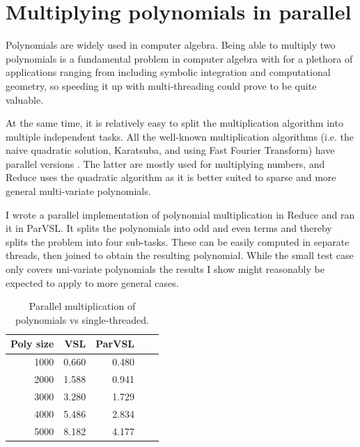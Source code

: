 \section{Multiplying polynomials in parallel}

Polynomials are widely used in computer algebra. Being able
to multiply two polynomials is a fundamental problem in computer
algebra with for a plethora of applications ranging from
including symbolic integration and computational geometry,
so speeding it up with multi-threading could prove to be quite valuable.

At the same time, it is relatively easy to split the multiplication
algorithm into multiple independent tasks. All the well-known
multiplication algorithms (i.e. the naive quadratic solution, Karatsuba,
and using Fast Fourier Transform) have parallel versions \cite[Chapter~30.3]{cormen}.
The latter are mostly used for multiplying numbers, and Reduce
uses the quadratic algorithm as it is better suited to sparse and
more general multi-variate polynomials.

I wrote a parallel implementation of polynomial multiplication in Reduce
and ran it in ParVSL. It splits the polynomials into odd and even
terms and thereby splits the problem into four sub-tasks. These can be
easily computed in separate threads, then joined to obtain the
resulting polynomial. While the small test case only covers uni-variate
polynomials the results I show might reasonably be expected to apply to
more general cases.

\begin{table}
  \centering
  \begin{tabular}{rrrrr}
  Poly size & VSL & ParVSL \\
  \hline
  1000 & 0.660 & 0.480 \\
  2000 & 1.588 & 0.941 \\
  3000 & 3.280 & 1.729 \\
  4000 & 5.486 & 2.834 \\
  5000 & 8.182 & 4.177 \\
  \end{tabular}
  \caption{Parallel multiplication of polynomials vs single-threaded.}
  \label{table:parpolymult}
\end{table}


